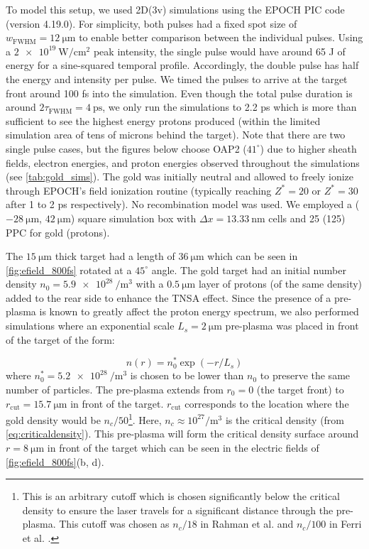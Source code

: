 To model this setup, we used 2D(3v) simulations using the EPOCH \gls{PIC} code (version 4.19.0). For simplicity, both pulses had a fixed spot size of $w_\text{FWHM} = \SI{12}{\micro \meter}$ to enable better comparison between the individual pulses. Using a $\SI{2e19}{\watt \per \centi \meter \squared}$ peak intensity, the single pulse would have around 65 J of energy for a sine-squared temporal profile. Accordingly, the double pulse has half the energy and intensity per pulse. We timed the pulses to arrive at the target front around 100 fs into the simulation. Even though the total pulse duration is around $2 \tau_\text{FWHM} = \SI{4}{\pico \second}$, we only run the simulations to 2.2 ps which is more than sufficient to see the highest energy protons produced (within the limited simulation area of tens of microns behind the target). Note that there are two single pulse cases, but the figures below choose \gls{OAP}2 ($41^\circ$) due to higher sheath fields, electron energies, and proton energies observed throughout the simulations (see \autoref{tab:gold_sims}). The gold was initially neutral and allowed to freely ionize through EPOCH's field ionization routine (typically reaching $Z^* = 20$ or $Z^* = 30$ after 1 to 2 ps respectively). No recombination model was used. We employed a ($-\SI{28}{\micro \meter}$, $\SI{42}{\micro \meter}$) square simulation box with $\Delta x = \SI{13.33}{\nano \meter}$ cells and 25 (125) \gls{PPC} for gold (protons).


The $\SI{15}{\micro \meter}$ thick target had a length of $\SI{36}{\micro \meter}$ which can be seen in \autoref{fig:efield_800fs} rotated at a $45^\circ$ angle. The gold target had an initial number density $n_0 = \SI{5.9e28}{\per \meter \cubed}$ with a $\SI{0.5}{\micro \meter}$ layer of protons (of the same density) added to the rear side to enhance the \gls{TNSA} effect. Since the presence of a pre-plasma is known to greatly affect the proton energy spectrum, we also performed simulations where an exponential scale $L_s = \SI{2}{\micro \meter}$ pre-plasma was placed in front of the target of the form: 

\begin{equation}
	n(r) = n_0^* \exp(-r / L_s) \label{eq:exponential_scale_pp}
\end{equation}
where $n_0^* = \SI{5.2e28}{\per \meter \cubed}$ is chosen to be lower than $n_0$ to preserve the same number of particles. The pre-plasma extends from $r_0=0$ (the target front) to $r_\text{cut} = \SI{15.7}{\micro \meter}$ in front of the target. $r_\text{cut}$ corresponds to the location where the gold density would be $n_c / 50$\footnote{This is an arbitrary cutoff which is chosen significantly below the critical density to ensure the laser travels for a significant distance through the pre-plasma. This cutoff was chosen as $n_c / 18$ in Rahman et al. \cite{Rahman_2021_PoP} and $n_c / 100$ in Ferri et al. \cite{Ferri_2019_Nat_Comm}.}. Here, $n_c \approx 10^{27} \unit{\per \meter \cubed}$ is the critical density (from \autoref{eq:criticaldensity}). This pre-plasma will form the critical density surface around $r = \SI{8}{\micro \meter}$ in front of the target which can be seen in the electric fields of \autoref{fig:efield_800fs}(b, d).

